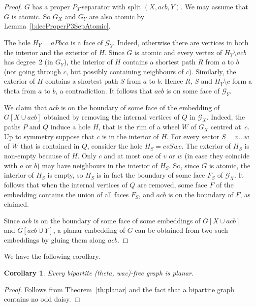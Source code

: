 \documentclass[11pt]{article}
\newtheorem{cor}[theo]{Corollary}
\newcommand{\sm}{\setminus}
\begin{document}
\begin{proof}
  \medskip
  
   $G$ has a proper $P_3$-separator with split $(X, acb, Y)$. We may assume that $G$ is atomic. So $G_X$ and $G_Y$ are also atomic by Lemma~\ref{l:decProperP3SepAtomic}.   
  
  The hole $H_Y = aPbca$ is a face of $\mathcal G_Y$. 
  Indeed, otherwise there are vertices in both the interior and the exterior of $H$. 
  Since $G$ is atomic and every vertex of $H_Y\sm acb$ has degree~2 (in $G_Y$), the interior of $H$ contains a shortest path $R$ from $a$ to $b$ (not going through $c$, but possibly containing neighbours of $c$).  
  Similarly, the exterior of $H$ contains a shortest path $S$ from $a$ to $b$. 
  Hence $R$, $S$ and $H_Y\sm c$ form a theta from $a$ to $b$, a contradiction.
  It follows that $acb$ is on some face of $\mathcal G_Y$. 
  
  We claim that $acb$ is on the boundary of some face of the embedding of $G[X \cup acb]$ obtained by removing the internal vertices of $Q$ in $\mathcal G_X$.  
  Indeed, the paths $P$ and $Q$ induce a hole $H$, that is the rim of a wheel $W$ of $G_X$ centred at~$c$.  
  Up to symmetry suppose that $c$ is in the interior of $H$.  
  For every sector $S = v\dots w$ of $W$ that is contained in $Q$, consider the hole $H_S = cvSwc$. 
  The exterior of $H_S$ is non-empty because of $H$.  
  Only $c$ and at most one of $v$ or $w$ (in case they coincide with $a$ or $b$) may have neighbours in the interior of $H_S$.  
  So, since $G$ is atomic, the interior of $H_S$ is empty, so $H_S$ is in fact the boundary of some face $F_S$ of $\mathcal G_X$. 
  It follows that when the internal vertices of $Q$ are removed, some face $F$ of the embedding contains the union of all faces $F_S$, and $acb$ is on the boundary of $F$, as claimed. 
  
  Since $acb$ is on the boundary of some face of some embeddings of $G[X \cup acb]$ and $G[acb \cup Y]$, a planar embedding of $G$ can be obtained from two such embeddings by gluing them along $acb$.  
\end{proof}
 
 
 We have the following corollary. 
 
 \begin{cor}
   Every bipartite (theta, wac)-free graph is planar. 
 \end{cor}

\begin{proof}
  Follows from Theorem~\ref{th:planar} and the fact that a bipartite graph contains no odd daisy. 
\end{proof}
\end{document}
